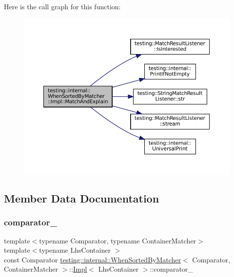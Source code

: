 Here is the call graph for this function\+:
\nopagebreak
\begin{figure}[H]
\begin{center}
\leavevmode
\includegraphics[width=350pt]{classtesting_1_1internal_1_1WhenSortedByMatcher_1_1Impl_a9d8f57c729df8c041f2fd7febbc950da_cgraph}
\end{center}
\end{figure}


\subsection{Member Data Documentation}
\mbox{\label{classtesting_1_1internal_1_1WhenSortedByMatcher_1_1Impl_a951b20230b095e7777c23cba8f143f32}} 
\subsubsection{\texorpdfstring{comparator\+\_\+}{comparator\_}}
{\footnotesize\ttfamily template$<$typename Comparator, typename Container\+Matcher$>$ \\
template$<$typename Lhs\+Container $>$ \\
const Comparator \hyperlink{classtesting_1_1internal_1_1WhenSortedByMatcher}{testing\+::internal\+::\+When\+Sorted\+By\+Matcher}$<$ Comparator, Container\+Matcher $>$\+::\hyperlink{classtesting_1_1internal_1_1WhenSortedByMatcher_1_1Impl}{Impl}$<$ Lhs\+Container $>$\+::comparator\+\_\+\hspace{0.3cm}{\ttfamily [private]}}



